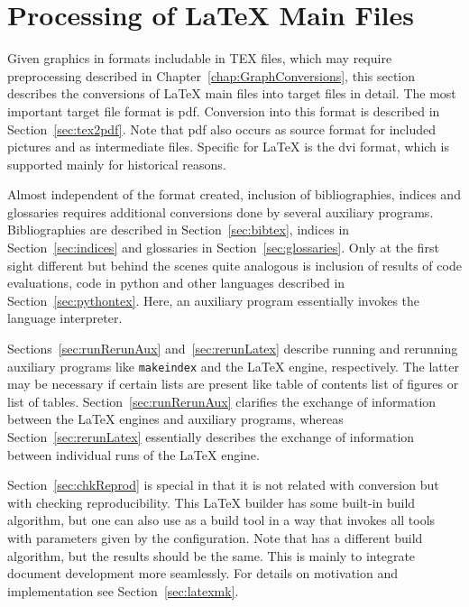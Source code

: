 
\chapter{Processing of \LaTeX{} Main Files}\label{chap:latexMainConversions}

Given graphics in formats includable in TEX files, 
which may require preprocessing described in 
Chapter~\ref{chap:GraphConversions}, 
this section describes the conversions of \LaTeX{} main files 
into target files in detail. 
The most important target file format is \gls{pdf}. 
Conversion into this format is described in Section~\ref{sec:tex2pdf}. 
Note that \gls{pdf} also occurs as source format 
for included pictures and as intermediate files. 
Specific for \LaTeX{} is the \gls{dvi} format, 
which is supported mainly for historical reasons. 

Almost independent of the format created, 
inclusion of bibliographies, indices and glossaries 
requires additional conversions 
done by several auxiliary programs. 
Bibliographies are described in Section~\ref{sec:bibtex}, 
indices in Section~\ref{sec:indices} 
and glossaries in Section~\ref{sec:glossaries}. 
Only at the first sight different 
but behind the scenes quite analogous 
is inclusion of results of code evaluations, 
code in python and other languages described in Section~\ref{sec:pythontex}. 
Here, an auxiliary program essentially invokes the language interpreter. 

Sections~\ref{sec:runRerunAux} and~\ref{sec:rerunLatex} 
describe running and rerunning auxiliary programs 
like \texttt{makeindex} and the \LaTeX{} engine, respectively. 
The latter may be necessary if certain lists are present 
like table of contents list of figures or list of tables. 
Section~\ref{sec:runRerunAux} clarifies the exchange of information  
between the \LaTeX{} engines and auxiliary programs, 
whereas Section~\ref{sec:rerunLatex} 
essentially describes the exchange of information 
between individual runs of the \LaTeX{} engine. 

Section~\ref{sec:chkReprod} is special in that it is not related with conversion 
but with checking reproducibility. 
This \LaTeX{} builder has some built-in build algorithm, 
but one can also use  as a build tool 
in a way that invokes all tools with parameters given by the configuration. 
Note that  has a different build algorithm, 
but the results should be the same. 
This is mainly to integrate document development more seamlessly. 
For details on motivation and implementation see Section~\ref{sec:latexmk}. 

